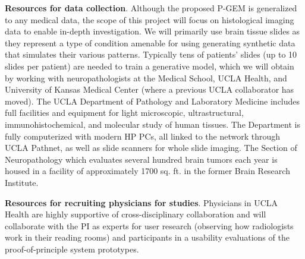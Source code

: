 {\bf Resources for data collection}.
Although the proposed P-GEM is generalized to any medical data, the scope of this project will focus on histological imaging data to enable in-depth investigation.
We will primarily use brain tissue slides as they represent a type of condition amenable for using generating synthetic data that simulates their various patterns.
Typically tens of patients' slides (up to 10 slides per patient) are needed to train a generative model, which we will obtain by working with neuropathologists at the Medical School, UCLA Health, and University of Kansas Medical Center (where a previous UCLA collaborator has moved).
The UCLA Department of Pathology and Laboratory Medicine includes full facilities and equipment for
light microscopic, ultrastructural, immunohistochemical, and molecular study of human tissues. The
Department is fully computerized with modern HP PCs, all linked to the network through UCLA Pathnet,
as well as slide scanners for whole slide imaging. The Section of Neuropathology which evaluates several
hundred brain tumors each year is housed in a facility of approximately 1700 sq. ft. in the former Brain
Research Institute.

{\bf Resources for recruiting physicians for studies}.
Physicians in UCLA Health are highly supportive of cross-disciplinary collaboration and will collaborate with the PI as experts for user research (\eg observing how radiologists work in their reading rooms) and participants in a usability evaluations of the proof-of-principle system prototypes. 